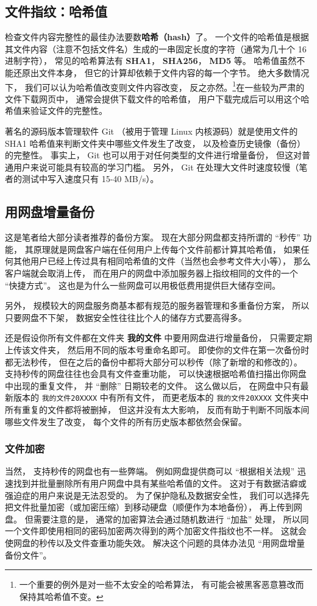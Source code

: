 \subsection{文件指纹：哈希值}
检查文件内容完整性的最佳办法要数\textbf{哈希（hash）}了。 一个文件的哈希值是根据其文件内容（注意不包括文件名）生成的一串固定长度的字符（通常为几十个 16 进制字符）， 常见的哈希算法有 \textbf{SHA1}， \textbf{SHA256}， \textbf{MD5} 等。 哈希值虽然不能还原出文件本身， 但它的计算却依赖于文件内容的每一个字节。 绝大多数情况下， 我们可以认为哈希值改变则文件内容改变， 反之亦然。\footnote{一个重要的例外是对一些不太安全的哈希算法， 有可能会被黑客恶意篡改而保持其哈希值不变。}在一些较为严肃的文件下载网页中， 通常会提供下载文件的哈希值， 用户下载完成后可以用这个哈希值来验证文件的完整性。

著名的源码版本管理软件 Git （被用于管理 Linux 内核源码）就是使用文件的 SHA1 哈希值来判断文件夹中哪些文件发生了改变， 以及检查历史镜像（备份）的完整性。 事实上， Git 也可以用于对任何类型的文件进行增量备份， 但这对普通用户来说可能具有较高的学习门槛。 另外， Git 在处理大文件时速度较慢（笔者的测试中写入速度只有 15-40 MB/s）。

\subsection{用网盘增量备份}
这是笔者给大部分读者推荐的备份方案。 现在大部分网盘都支持所谓的 “秒传” 功能， 其原理就是网盘客户端在任何用户上传每个文件前都计算其哈希值， 如果任何其他用户已经上传过具有相同哈希值的文件（当然也会参考文件大小等）， 那么客户端就会取消上传， 而在用户的网盘中添加服务器上指纹相同的文件的一个 “快捷方式”。 这也是为什么一些网盘可以用极低费用提供巨大储存空间。

另外， 规模较大的网盘服务商基本都有规范的服务器管理和多重备份方案， 所以只要网盘不下架， 数据安全性往往比个人的储存方式要高得多。

还是假设你所有文件都在文件夹 \textbf{我的文件} 中要用网盘进行增量备份， 只需要定期上传该文件夹， 然后用不同的版本号重命名即可。 即使你的文件在第一次备份时都无法秒传， 但在之后的备份中都将大部分可以秒传（除了新增的和修改的）。 支持秒传的网盘往往也会具有文件查重功能， 可以快速根据哈希值扫描出你网盘中出现的重复文件， 并 “删除” 日期较老的文件。 这么做以后， 在网盘中只有最新版本的 \verb|我的文件20XXXX| 中有所有文件， 而更老版本的 \verb|我的文件20XXXX| 文件夹中所有重复的文件都将被删掉， 但这并没有太大影响， 反而有助于判断不同版本间哪些文件发生了改变， 每个文件的所有历史版本都依然会保留。

\subsubsection{文件加密}
当然， 支持秒传的网盘也有一些弊端。 例如网盘提供商可以 “根据相关法规” 迅速找到并批量删除所有用户网盘中具有某些哈希值的文件。 这对于有数据洁癖或强迫症的用户来说是无法忍受的。 为了保护隐私及数据安全性， 我们可以选择先把文件批量加密（或加密压缩）到移动硬盘（顺便作为本地备份）， 再上传到网盘。 但需要注意的是， 通常的加密算法会通过随机数进行 “加盐” 处理， 所以同一个文件即使用相同的密码加密两次得到的两个加密文件指纹也不一样。 这就会使网盘的秒传以及文件查重功能失效。 解决这个问题的具体办法见 “用网盘增量备份文件”。

